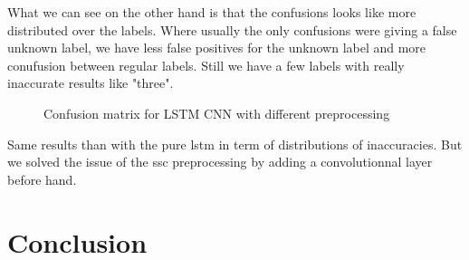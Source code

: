 \newpage

What we can see on the other hand is that the confusions looks like more distributed over the labels. Where usually the only confusions were giving a false unknown label, we have less false positives for the unknown label and more conufusion between regular labels. Still we have a few labels with really inaccurate results like "three".



\begin{figure}[h!]

    \centering
    \qquad
    \caption{Confusion matrix for LSTM CNN with different preprocessing}
    \label{fig:confusion_lstm_cnn}

\end{figure}

Same results than with the pure lstm in term of distributions of inaccuracies. But we solved the issue of the ssc preprocessing by adding a convolutionnal layer before hand.



\section{Conclusion}

